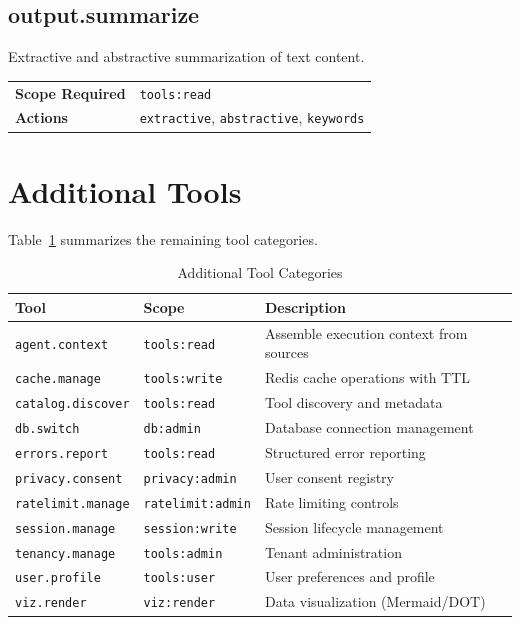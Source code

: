 \subsection{output.summarize}

Extractive and abstractive summarization of text content.

\begin{table}[ht]
\centering
\small
\begin{tabularx}{\textwidth}{lX}
    \hline
    \textbf{Scope Required} & \texttt{tools:read} \\
    \textbf{Actions} & \texttt{extractive}, \texttt{abstractive}, \texttt{keywords} \\
    \hline
\end{tabularx}
\end{table}

\section{Additional Tools}
\label{app:tools:additional}

Table~\ref{tab:additional-tools} summarizes the remaining tool categories.

\begin{table}[ht]
\centering
\caption{Additional Tool Categories}
\label{tab:additional-tools}
\small
\begin{tabularx}{\textwidth}{llX}
    \hline
    \textbf{Tool} & \textbf{Scope} & \textbf{Description} \\
    \hline
    \texttt{agent.context} & \texttt{tools:read} & Assemble execution context from sources \\
    \texttt{cache.manage} & \texttt{tools:write} & Redis cache operations with TTL \\
    \texttt{catalog.discover} & \texttt{tools:read} & Tool discovery and metadata \\
    \texttt{db.switch} & \texttt{db:admin} & Database connection management \\
    \texttt{errors.report} & \texttt{tools:read} & Structured error reporting \\
    \texttt{privacy.consent} & \texttt{privacy:admin} & User consent registry \\
    \texttt{ratelimit.manage} & \texttt{ratelimit:admin} & Rate limiting controls \\
    \texttt{session.manage} & \texttt{session:write} & Session lifecycle management \\
    \texttt{tenancy.manage} & \texttt{tools:admin} & Tenant administration \\
    \texttt{user.profile} & \texttt{tools:user} & User preferences and profile \\
    \texttt{viz.render} & \texttt{viz:render} & Data visualization (Mermaid/DOT) \\
    \hline
\end{tabularx}
\end{table}

